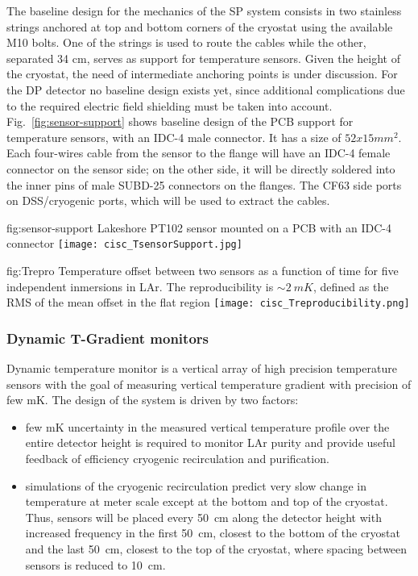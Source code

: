 The baseline design for the mechanics of the SP system consists in two stainless strings anchored at top and bottom corners of the cryostat
using the available M10 bolts. One of the strings is used to route the cables while the other, separated 34 cm, serves as support for temperature sensors.
Given the height of the cryostat, the need of intermediate anchoring points is under discussion. For the DP detector no baseline design exists yet,
since additional complications due to the required electric field shielding must be taken into account. Fig.~\ref{fig:sensor-support} shows baseline design of the
PCB support for temperature sensors, with an IDC-4 male connector. It has a size of $52x15 mm^2$. Each four-wires cable from the sensor to the flange will have an IDC-4 female connector
on the sensor side; on the other side, it will be directly soldered into the inner pins of male SUBD-25 connectors on the flanges. The CF63 side ports on DSS/cryogenic ports,
which will be used to extract the cables. 

\begin{dunefigure}{fig:sensor-support}
  {Lakeshore PT102 sensor mounted on a PCB with an IDC-4 connector}
  \texttt{[image: cisc\_TsensorSupport.jpg]}%
\end{dunefigure}


\begin{dunefigure}{fig:Trepro}
  {Temperature offset between two sensors as a function of time for five independent inmersions in LAr. The reproducibility is $\sim \SI{2}{mK}$,
    defined as the RMS of the mean offset in the flat region}
  \texttt{[image: cisc\_Treproducibility.png]}%
\end{dunefigure}


\subsubsection{Dynamic T-Gradient monitors}

Dynamic temperature monitor is a vertical array of high precision temperature sensors with the goal of measuring vertical temperature gradient with precision of few mK. The design of the system is driven by two factors:
\begin{itemize}
\item
few mK uncertainty in the measured vertical temperature profile over the entire detector height is required to monitor LAr purity and provide useful feedback of efficiency cryogenic recirculation and purification.
\item
simulations of the cryogenic recirculation predict very slow change in temperature at meter scale except at the bottom and top of the cryostat. Thus, sensors will be placed every \SI{50}{cm} along the detector height with increased frequency in the first \SI{50}{cm}, closest to the bottom of the cryostat and the last \SI{50}{cm}, closest to the top of the cryostat, where spacing between sensors is reduced to \SI{10}{cm}.
 \end{itemize}


